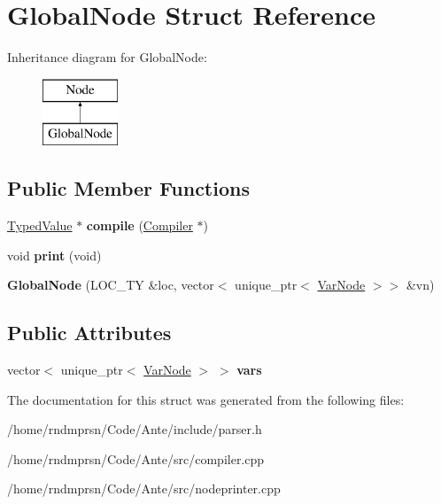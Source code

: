 \hypertarget{structGlobalNode}{}\section{Global\+Node Struct Reference}
\label{structGlobalNode}
Inheritance diagram for Global\+Node\+:\begin{figure}[H]
\begin{center}
\leavevmode
\includegraphics[height=2.000000cm]{structGlobalNode}
\end{center}
\end{figure}
\subsection*{Public Member Functions}
\begin{DoxyCompactItemize}
\item 
\mbox{\label{structGlobalNode_ab158e7bef70eaeec228098f162b1ca46}} 
\hyperlink{structTypedValue}{Typed\+Value} $\ast$ {\bfseries compile} (\hyperlink{structante_1_1Compiler}{Compiler} $\ast$)
\item 
\mbox{\label{structGlobalNode_a8cc017454bfcbaf541b4593132f138e2}} 
void {\bfseries print} (void)
\item 
\mbox{\label{structGlobalNode_a174b447d5051c3735048c48927958c0d}} 
{\bfseries Global\+Node} (L\+O\+C\+\_\+\+TY \&loc, vector$<$ unique\+\_\+ptr$<$ \hyperlink{structVarNode}{Var\+Node} $>$$>$ \&vn)
\end{DoxyCompactItemize}
\subsection*{Public Attributes}
\begin{DoxyCompactItemize}
\item 
\mbox{\label{structGlobalNode_ac663eafd6e9207404221a22c5aed64cf}} 
vector$<$ unique\+\_\+ptr$<$ \hyperlink{structVarNode}{Var\+Node} $>$ $>$ {\bfseries vars}
\end{DoxyCompactItemize}


The documentation for this struct was generated from the following files\+:\begin{DoxyCompactItemize}
\item 
/home/rndmprsn/\+Code/\+Ante/include/parser.\+h\item 
/home/rndmprsn/\+Code/\+Ante/src/compiler.\+cpp\item 
/home/rndmprsn/\+Code/\+Ante/src/nodeprinter.\+cpp\end{DoxyCompactItemize}
